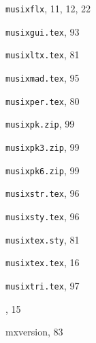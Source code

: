 \begin{theindex}
  \item {\tt musixflx}, 11, 12, 22
  \item {\tt  musixgui.tex}, 93
  \item {\tt  musixltx.tex}, 81
  \item {\tt  musixmad.tex}, 95
  \item {\tt  musixper.tex}, 80
  \item {\tt  musixpk.zip}, 99
  \item {\tt  musixpk3.zip}, 99
  \item {\tt  musixpk6.zip}, 99
  \item {\tt musixstr.tex}, 96
  \item {\tt musixsty.tex}, 96
  \item {\tt  musixtex.sty}, 81
  \item {\tt musixtex.tex}, 16
  \item {\tt musixtri.tex}, 97
  \item \protect\mutex, 15
  \item {\Bslash mxversion}, 83

  \indexspace


\end{theindex}
